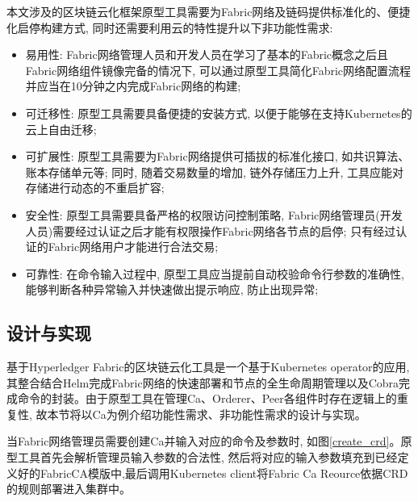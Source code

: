 本文涉及的区块链云化框架原型工具需要为Fabric网络及链码提供标准化的、便捷化启停构建方式, 同时还需要利用云的特性提升以下非功能性需求:

\begin{itemize}[itemindent=2em]
    \item 易用性: Fabric网络管理人员和开发人员在学习了基本的Fabric概念之后且Fabric网络组件镜像完备的情况下, 可以通过原型工具简化Fabric网络配置流程并应当在10分钟之内完成Fabric网络的构建;

    \item 可迁移性: 原型工具需要具备便捷的安装方式, 以便于能够在支持Kubernetes的云上自由迁移;

    \item 可扩展性: 原型工具需要为Fabric网络提供可插拔的标准化接口, 如共识算法、账本存储单元等; 同时, 随着交易数量的增加, 链外存储压力上升, 工具应能对存储进行动态的不重启扩容;

    \item 安全性: 原型工具需要具备严格的权限访问控制策略, Fabric网络管理员(开发人员)需要经过认证之后才能有权限操作Fabric网络各节点的启停; 只有经过认证的Fabric网络用户才能进行合法交易;

    \item 可靠性: 在命令输入过程中, 原型工具应当提前自动校验命令行参数的准确性, 能够判断各种异常输入并快速做出提示响应, 防止出现异常;

\end{itemize}


\subsection{设计与实现}

基于Hyperledger Fabric的区块链云化工具是一个基于Kubernetes operator的应用, 其整合结合Helm完成Fabric网络的快速部署和节点的全生命周期管理以及Cobra\footnotemark[1]完成命令的封装。由于原型工具在管理Ca、Orderer、Peer各组件时存在逻辑上的重复性, 故本节将以Ca为例介绍功能性需求、非功能性需求的设计与实现。

当Fabric网络管理员需要创建Ca并输入对应的命令及参数时, 如图\ref{create_crd}。原型工具首先会解析管理员输入参数的合法性, 然后将对应的输入参数填充到已经定义好的FabricCA模版中,最后调用Kubernetes client将Fabric Ca Reource依据CRD的规则部署进入集群中。 

